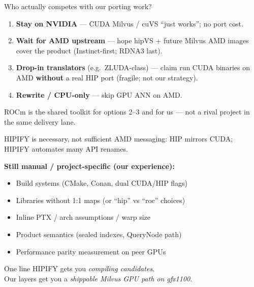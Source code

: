 \documentclass[aspectratio=169,11pt]{beamer}
\begin{document}
\begin{frame}{Who actually competes with our porting work?}
  \begin{enumerate}
    \item \textbf{Stay on NVIDIA} --- CUDA Milvus / cuVS ``just works'';
          no port cost.
    \item \textbf{Wait for AMD upstream} --- hope hipVS + future Milvus AMD
          images cover the product (Instinct-first; RDNA3 last).
    \item \textbf{Drop-in translators} (e.g.\ ZLUDA-class) --- claim run CUDA
          binaries on AMD \textbf{without} a real HIP port
          (fragile; not our strategy).
    \item \textbf{Rewrite / CPU-only} --- skip GPU ANN on AMD.
  \end{enumerate}

  \vspace{0.45em}
  {\footnotesize ROCm is the shared toolkit for options 2--3 and for us ---
   not a rival project in the same delivery lane.}
\end{frame}

\begin{frame}{HIPIFY is necessary, not sufficient}
  \footnotesize
  AMD messaging: HIP mirrors CUDA; HIPIFY automates many API renames.

  \vspace{0.35em}
  \textbf{Still manual / project-specific (our experience):}
  \begin{itemize}
    \item Build systems (CMake, Conan, dual CUDA/HIP flags)
    \item Libraries without 1:1 maps (or ``hip'' vs ``roc'' choices)
    \item Inline PTX / arch assumptions / warp size
    \item Product semantics (sealed indexes, QueryNode path)
    \item Performance parity measurement on peer GPUs
  \end{itemize}

  \vspace{0.35em}
  \begin{block}{One line}
    HIPIFY gets you \emph{compiling candidates}.\\
    Our layers get you a \emph{shippable Milvus GPU path on gfx1100}.
  \end{block}
\end{frame}
\end{document}
